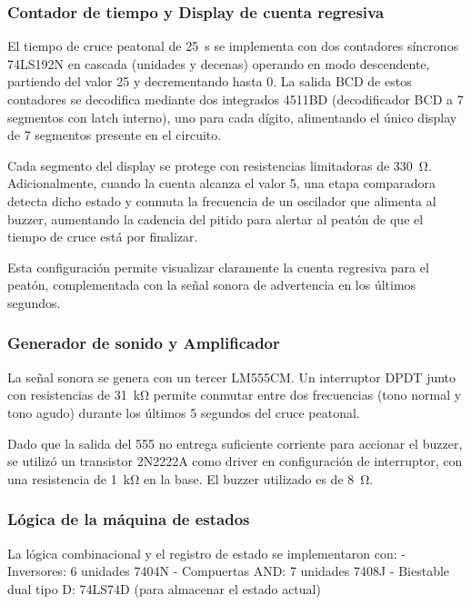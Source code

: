 \documentclass[10pt,onecolumn]{IEEEtran}
\begin{document}
\subsubsection{Contador de tiempo y Display de cuenta regresiva}
El tiempo de cruce peatonal de \SI{25}{\second} se implementa con dos contadores síncronos 74LS192N en cascada (unidades y decenas) operando en modo descendente, partiendo del valor 25 y decrementando hasta 0. La salida BCD de estos contadores se decodifica mediante dos integrados 4511BD (decodificador BCD a 7 segmentos con latch interno), uno para cada dígito, alimentando el único display de 7 segmentos presente en el circuito.

Cada segmento del display se protege con resistencias limitadoras de \SI{330}{\ohm}. Adicionalmente, cuando la cuenta alcanza el valor 5, una etapa comparadora detecta dicho estado y conmuta la frecuencia de un oscilador que alimenta al buzzer, aumentando la cadencia del pitido para alertar al peatón de que el tiempo de cruce está por finalizar.

Esta configuración permite visualizar claramente la cuenta regresiva para el peatón, complementada con la señal sonora de advertencia en los últimos segundos.
\\
\subsubsection{Generador de sonido y Amplificador}

La señal sonora se genera con un tercer LM555CM. Un interruptor DPDT junto con resistencias de \SI{31}{\kilo\ohm} permite conmutar entre dos frecuencias (tono normal y tono agudo) durante los últimos 5 segundos del cruce peatonal.

Dado que la salida del 555 no entrega suficiente corriente para accionar el buzzer, se utilizó un transistor 2N2222A como driver en configuración de interruptor, con una resistencia de \SI{1}{\kilo\ohm} en la base. El buzzer utilizado es de \SI{8}{\ohm}.
\\
\subsubsection{Lógica de la máquina de estados}

La lógica combinacional y el registro de estado se implementaron con:
- Inversores: 6 unidades 7404N
- Compuertas AND: 7 unidades 7408J
- Biestable dual tipo D: 74LS74D (para almacenar el estado actual)
\end{document}
